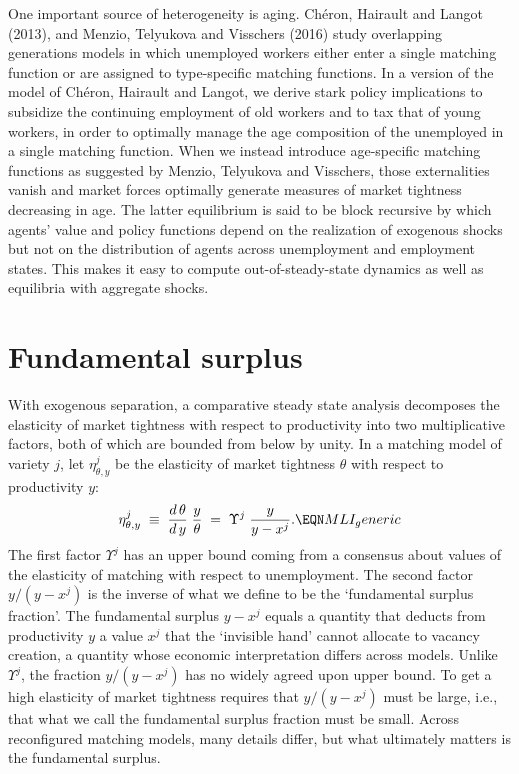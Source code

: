 One important  source of heterogeneity is aging. Ch\'eron,
Hairault and Langot (2013), and Menzio, Telyukova and Visschers (2016)
study overlapping generations models in which unemployed
workers either enter a single matching function or are assigned
to type-specific matching functions. In a version of the
model of Ch\'eron, Hairault and Langot, we derive
stark policy implications to subsidize the continuing employment
of old workers and to tax that of young workers, in order
to optimally manage the age composition of the unemployed
in a single matching function. When we instead introduce
age-specific matching functions as suggested by
Menzio, Telyukova and Visschers,
those externalities vanish and market forces optimally
generate measures of market tightness decreasing in age.
The latter equilibrium is said to be block recursive by
which agents' value and policy functions depend on the
realization of exogenous shocks but not on the distribution
of agents across unemployment and employment states. This
makes it easy to compute out-of-steady-state dynamics
as well as equilibria with aggregate shocks.


\section{Fundamental surplus}
With exogenous separation,  a comparative steady state analysis decomposes  the elasticity of market tightness with respect to productivity into
two multiplicative factors,  both of which are bounded from below by unity.
In a matching model  of variety $j$, let $\eta^j_{\theta,y}$ be the elasticity of
market tightness $\theta$ with respect to productivity $y$:
$$
 \eta^j_{\theta,y}
\;\equiv\; {d\, \theta \over d\, y} \; {y \over \theta}
\;=\; \Upsilon^j \; \frac{y}{y-x^j} .    \EQN MLI_generic
$$
The first factor $\Upsilon^j$  has  an   upper bound
coming  from a consensus  about values of the elasticity
of matching with respect to unemployment. The second factor
$y/(y-x^j)$ is the inverse of what we  define to be   the
`fundamental surplus fraction'. The fundamental surplus $y-x^j$ equals a quantity that  deducts from productivity $y$ a
value $x^j$ that the `invisible hand' cannot allocate to
vacancy creation, a quantity whose economic interpretation differs across models.  Unlike $\Upsilon^j$, the fraction $y/(y-x^j)$ has no
widely agreed upon upper bound.
To get a high elasticity of market
tightness requires that $y/(y-x^j)$ must  be large, i.e., that  what we call the
fundamental surplus fraction must be small.
 Across reconfigured matching models, many details
differ, but
what ultimately matters is the fundamental surplus.


